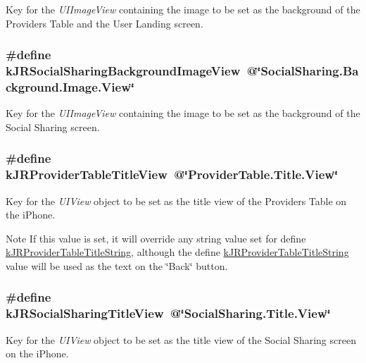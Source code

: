 \label{group__custom_interface_ga68a4950b1b3834ce60218856f596059f}
Key for the {\itshape UIImageView\/} containing the image to be set as the background of the Providers Table and the User Landing screen. \hypertarget{group__custom_interface_gafe08832d1e15427e1bc1c8c1e3a4c641}{
\subsubsection[{kJRSocialSharingBackgroundImageView}]{\setlength{\rightskip}{0pt plus 5cm}\#define kJRSocialSharingBackgroundImageView~@\char`\"{}SocialSharing.Background.Image.View\char`\"{}}}
\label{group__custom_interface_gafe08832d1e15427e1bc1c8c1e3a4c641}
Key for the {\itshape UIImageView\/} containing the image to be set as the background of the Social Sharing screen. \hypertarget{group__custom_interface_ga0bce97edf43c9cdf53cbcd1aa92c4798}{
\subsubsection[{kJRProviderTableTitleView}]{\setlength{\rightskip}{0pt plus 5cm}\#define kJRProviderTableTitleView~@\char`\"{}ProviderTable.Title.View\char`\"{}}}
\label{group__custom_interface_ga0bce97edf43c9cdf53cbcd1aa92c4798}
Key for the {\itshape UIView\/} object to be set as the title view of the Providers Table on the iPhone.

\begin{DoxyNote}{Note}
If this value is set, it will override any string value set for define \hyperlink{group__custom_interface_gaf728e45125be9ca6fa515a39a77e7ce7}{kJRProviderTableTitleString}, although the define \hyperlink{group__custom_interface_gaf728e45125be9ca6fa515a39a77e7ce7}{kJRProviderTableTitleString} value will be used as the text on the \char`\"{}Back\char`\"{} button. 
\end{DoxyNote}
\hypertarget{group__custom_interface_ga524965cf426f0eb9de4bcb804528c7f7}{
\subsubsection[{kJRSocialSharingTitleView}]{\setlength{\rightskip}{0pt plus 5cm}\#define kJRSocialSharingTitleView~@\char`\"{}SocialSharing.Title.View\char`\"{}}}
\label{group__custom_interface_ga524965cf426f0eb9de4bcb804528c7f7}
Key for the {\itshape UIView\/} object to be set as the title view of the Social Sharing screen on the iPhone.

